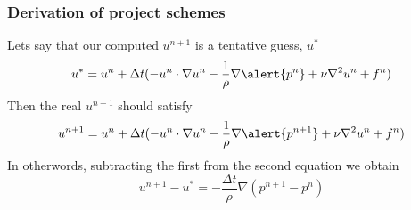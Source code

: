 \begin{frame}
\frametitle{Derivation of project schemes}
Lets say that our computed $u^{n+1}$ is a tentative guess, $u^*$ 
\[   
u^{*} = u^n + \Delta t ( -u^n \cdot \nabla u^n
    -\frac{1}{\rho}\nabla \alert{p^n}  + \nu \nabla^2 u^n + f^n) 
\]
Then the real $u^{n+1}$ should satisfy
\[   
u^{n+1} = u^n + \Delta t ( -u^n \cdot \nabla u^n
    -\frac{1}{\rho}\nabla \alert{p^{n+1}}  + \nu \nabla^2 u^n + f^n) 
\]
In otherwords, subtracting the first from the second equation we obtain
\[
u^{n+1} - u^* = -\frac{\Delta t}{\rho} \nabla (p^{n+1} - p^n) 
\]



\end{frame}


